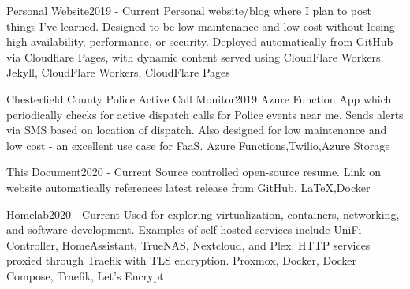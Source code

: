 \begin{projects}
    \project
    {Personal Website}{2019 - Current}
    {}
    {Personal website/blog where I plan to post things I've learned. Designed to be low maintenance and low cost without losing high availability, performance, or security. Deployed automatically from GitHub via Cloudflare Pages, with dynamic content served using CloudFlare Workers.}
    {Jekyll, CloudFlare Workers, CloudFlare Pages}

    \project
    {Chesterfield County Police Active Call Monitor}{2019}
    {}
    {Azure Function App which periodically checks for active dispatch calls for Police events near me. Sends alerts via SMS based on location of dispatch. Also designed for low maintenance and low cost - an excellent use case for FaaS.}
    {Azure Functions,Twilio,Azure Storage}

    \project
    {This Document}{2020 - Current}
    {}
    {Source controlled open-source resume. Link on website automatically references latest release from GitHub.}%
    {\LaTeX,Docker}

    \project
    {Homelab}{2020 - Current}
    {}
    {Used for exploring virtualization, containers, networking, and software development. Examples of self-hosted services include UniFi Controller, HomeAssistant, TrueNAS, Nextcloud, and Plex. HTTP services proxied through Traefik with TLS encryption.}
    {Proxmox, Docker, Docker Compose, Traefik, Let's Encrypt}
\end{projects}